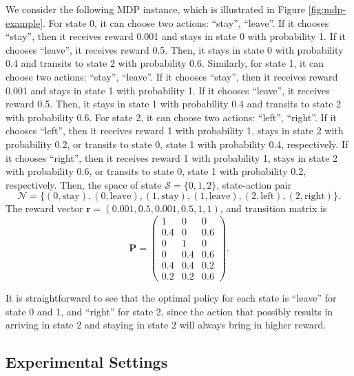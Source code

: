 \documentclass[12pt]{article}
\begin{document}
We consider the following MDP instance, which is illustrated in Figure \ref{fig:mdp-example}. For state 0, it can choose two actions: ``stay'', ``leave''. If it chooses ``stay'', then it receives reward 0.001 and stays in state 0 with probability 1. If it chooses ``leave'', it receives reward 0.5. Then, it stays in state 0 with probability 0.4 and transits to state 2 with probability 0.6. Similarly, for state 1, it can choose two actions: ``stay'', ``leave''. If it chooses ``stay'', then it receives reward 0.001 and stays in state 1 with probability 1. If it chooses ``leave'', it receives reward 0.5. Then, it stays in state 1 with probability 0.4 and transits to state 2 with probability 0.6. For state 2, it can choose two actions: ``left'', ``right''. If it chooses ``left'', then it receives reward 1 with probability 1, stays in state 2 with probability 0.2, or transits to state 0, state 1 with probability 0.4, respectively. If it chooses ``right'', then it receives reward 1 with probability 1, stays in state 2 with probability 0.6, or transits to state 0, state 1 with probability 0.2, respectively. Then, the space of state $\mathcal{S} = \{0,1,2\}$, state-action pair 
$$\mathcal{N} = \{(0,\text{stay}),(0,\text{leave}),(1,\text{stay}),(1,\text{leave}),(2,\text{left}),(2,\text{right})\}.$$ The reward vector $\boldsymbol{\text{r}} = (0.001,0.5,0.001,0.5,1,1)$, and transition matrix is
\begin{equation*}
    \boldsymbol{\text{P}} = \begin{pmatrix}
        1 & 0 & 0 \\
        0.4 & 0 & 0.6 \\
        0 & 1 & 0 \\
        0 & 0.4 & 0.6\\
        0.4 & 0.4 & 0.2 \\
        0.2 & 0.2 & 0.6
    \end{pmatrix}.
\end{equation*}

It is straightforward to see that the optimal policy for each state is ``leave'' for state 0 and 1, and ``right'' for state 2, since the action that possibly results in arriving in state 2 and staying in state 2 will always bring in higher reward.


\subsection{Experimental Settings}
\end{document}
